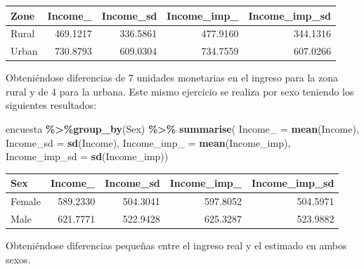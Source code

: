 \documentclass[
  spanish,
  12pt,
]{book}
\newenvironment{Shaded}{\begin{snugshade}}{\end{snugshade}}
\newcommand{\AttributeTok}[1]{\textcolor[rgb]{0.13,0.29,0.53}{#1}}
\newcommand{\FunctionTok}[1]{\textcolor[rgb]{0.13,0.29,0.53}{\textbf{#1}}}
\newcommand{\NormalTok}[1]{#1}
\newcommand{\SpecialCharTok}[1]{\textcolor[rgb]{0.81,0.36,0.00}{\textbf{#1}}}
\begin{document}
\begin{tabular}{l|r|r|r|r}
\hline
Zone & Income\_ & Income\_sd & Income\_imp\_ & Income\_imp\_sd\\
\hline
Rural & 469.1217 & 336.5861 & 477.9160 & 344.1316\\
\hline
Urban & 730.8793 & 609.0304 & 734.7559 & 607.0266\\
\hline
\end{tabular}

Obteniéndose diferencias de 7 unidades monetarias en el ingreso para la zona rural y de 4 para la urbana. Este mismo ejercicio se realiza por sexo teniendo los siguientes resultados:

\begin{Shaded}
\begin{Highlighting}[]
\NormalTok{encuesta }\SpecialCharTok{\%\textgreater{}\%}\FunctionTok{group\_by}\NormalTok{(Sex) }\SpecialCharTok{\%\textgreater{}\%}  \FunctionTok{summarise}\NormalTok{(}
  \AttributeTok{Income\_ =} \FunctionTok{mean}\NormalTok{(Income),}
  \AttributeTok{Income\_sd =} \FunctionTok{sd}\NormalTok{(Income),}
  \AttributeTok{Income\_imp\_ =} \FunctionTok{mean}\NormalTok{(Income\_imp),}
  \AttributeTok{Income\_imp\_sd =} \FunctionTok{sd}\NormalTok{(Income\_imp))}
\end{Highlighting}
\end{Shaded}

\begin{tabular}{l|r|r|r|r}
\hline
Sex & Income\_ & Income\_sd & Income\_imp\_ & Income\_imp\_sd\\
\hline
Female & 589.2330 & 504.3041 & 597.8052 & 504.5971\\
\hline
Male & 621.7771 & 522.9428 & 625.3287 & 523.9882\\
\hline
\end{tabular}

Obteniéndose diferencias pequeñas entre el ingreso real y el estimado en ambos sexos.
\end{document}
